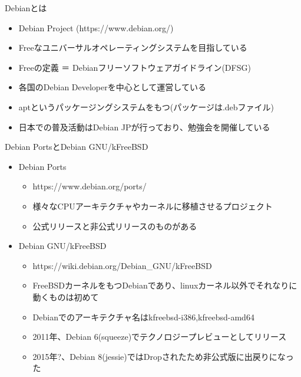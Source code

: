 
\begin{frame}[containsverbatim]{Debianとは}
  \begin{itemize}
    \item Debian Project (https://www.debian.org/)
    \item Freeなユニバーサルオペレーティングシステムを目指している
    \item Freeの定義 ＝ Debianフリーソフトウェアガイドライン(DFSG)
    \item 各国のDebian Developerを中心として運営している
    \item aptというパッケージングシステムをもつ(パッケージは.debファイル)
    \item 日本での普及活動はDebian JPが行っており、勉強会を開催している
  \end{itemize}
\end{frame}


\begin{frame}[containsverbatim]{Debian PortsとDebian GNU/kFreeBSD}
  \begin{itemize}
    \item Debian Ports
    \begin{itemize}
      \item https://www.debian.org/ports/
      \item 様々なCPUアーキテクチャやカーネルに移植させるプロジェクト
      \item 公式リリースと非公式リリースのものがある
    \end{itemize}
    \item Debian GNU/kFreeBSD
    \begin{itemize}
      \item https://wiki.debian.org/Debian\_GNU/kFreeBSD
      \item FreeBSDカーネルをもつDebianであり、linuxカーネル以外でそれなりに動くものは初めて
      \item Debianでのアーキテクチャ名はkfreebsd-i386,kfreebsd-amd64
      \item 2011年、Debian 6(squeeze)でテクノロジープレビューとしてリリース
      \item 2015年?、Debian 8(jessie)ではDropされたため非公式版に出戻りになった
    \end{itemize}
  \end{itemize}
\end{frame}


